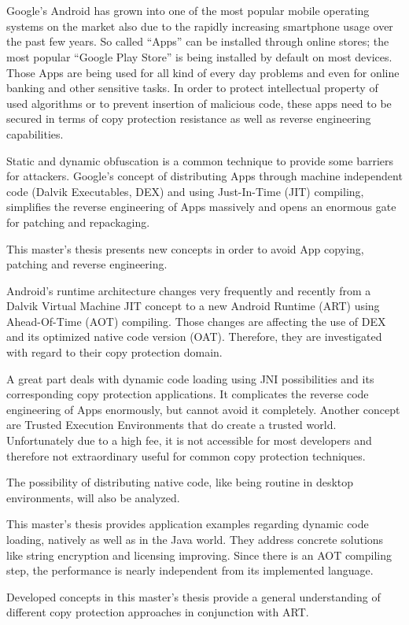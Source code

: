 \chapter*{\abstractname}
Google's Android has grown into one of the most popular mobile operating systems on the market also due to the rapidly increasing smartphone usage
over the past few years. So called ``Apps'' can be installed through
online stores; the most popular ``Google Play Store'' is being installed by default on most devices.
Those Apps are being used for all kind of every day problems and
even for online banking and other sensitive tasks.
In order to protect intellectual property of used algorithms or to
prevent insertion of malicious code, these apps need to be secured
in terms of copy protection resistance as well as reverse
engineering capabilities.

Static and dynamic obfuscation is a common
technique to provide some barriers for attackers. Google's concept of
distributing Apps through machine independent code (Dalvik Executables, DEX) and using Just-In-Time (JIT) compiling, simplifies the reverse engineering of Apps massively and opens an enormous gate for patching and repackaging.

This master's thesis presents new concepts in order to avoid App copying,
patching and reverse engineering.

Android's runtime architecture changes very frequently and recently from a Dalvik Virtual Machine JIT concept to a new Android Runtime (ART) using Ahead-Of-Time (AOT) compiling. Those changes are affecting the use of DEX and its optimized native code version (OAT). Therefore, they are investigated with regard to their copy protection domain.

A great part deals with dynamic code loading using JNI possibilities and its
corresponding copy protection applications. It complicates the reverse code
engineering of Apps enormously, but cannot avoid it completely.
Another concept are Trusted Execution Environments
that do create a trusted world. Unfortunately due to a high fee, it is not accessible for most developers and therefore not extraordinary useful for common copy protection techniques.

The possibility of distributing native code, like being routine in desktop environments, will also be analyzed.

This master's thesis provides application examples regarding dynamic code loading, natively as well as in the Java world. They address concrete solutions like string encryption and licensing improving.
Since there is an AOT compiling step, the performance is nearly
independent from its implemented language.

Developed concepts in this master's thesis provide a general understanding of different copy protection approaches in conjunction with ART.
